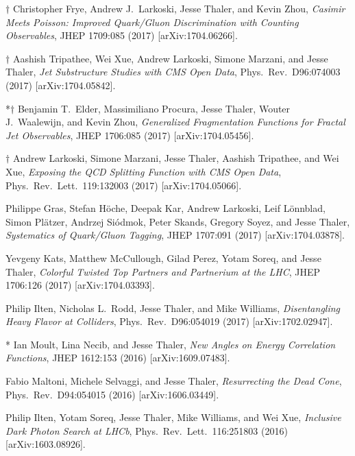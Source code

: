 \begin{list}{[]\addtocounter{jessecount}{-1}}{\leftmargin=3em \itemsep=4pt}
\item
$\dagger$ Christopher Frye, Andrew J.\ Larkoski, Jesse Thaler, and Kevin Zhou,
\emph{Casimir Meets Poisson: Improved Quark/Gluon Discrimination with Counting Observables},
JHEP 1709:085 (2017)
[arXiv:1704.06266].

\item
$\dagger$ Aashish Tripathee, Wei Xue, Andrew Larkoski, Simone Marzani, and Jesse Thaler,
\emph{Jet Substructure Studies with CMS Open Data},
Phys.\ Rev.\ D96:074003 (2017)
[arXiv:1704.05842].

\item
*$\dagger$ Benjamin T.\ Elder, Massimiliano Procura, Jesse Thaler, Wouter J.\ Waalewijn, and Kevin Zhou,
\emph{Generalized Fragmentation Functions for Fractal Jet Observables},
JHEP 1706:085 (2017)
[arXiv:1704.05456].

\item
$\dagger$ Andrew Larkoski, Simone Marzani, Jesse Thaler, Aashish Tripathee, and Wei Xue,
\emph{Exposing the QCD Splitting Function with CMS Open Data},
Phys.\ Rev.\ Lett.\ 119:132003 (2017)
[arXiv:1704.05066].

\item
 Philippe Gras, Stefan Höche, Deepak Kar, Andrew Larkoski, Leif Lönnblad, Simon Plätzer, Andrzej Siódmok, Peter Skands, Gregory Soyez, and Jesse Thaler,
\emph{Systematics of Quark/Gluon Tagging},
JHEP 1707:091 (2017)
[arXiv:1704.03878].

\item
 Yevgeny Kats, Matthew McCullough, Gilad Perez, Yotam Soreq, and Jesse Thaler,
\emph{Colorful Twisted Top Partners and Partnerium at the LHC},
JHEP 1706:126 (2017)
[arXiv:1704.03393].

\item
 Philip Ilten, Nicholas L.\ Rodd, Jesse Thaler, and Mike Williams,
\emph{Disentangling Heavy Flavor at Colliders},
Phys.\ Rev.\ D96:054019 (2017)
[arXiv:1702.02947].

\item
* Ian Moult, Lina Necib, and Jesse Thaler,
\emph{New Angles on Energy Correlation Functions},
JHEP 1612:153 (2016)
[arXiv:1609.07483].

\item
 Fabio Maltoni, Michele Selvaggi, and Jesse Thaler,
\emph{Resurrecting the Dead Cone},
Phys.\ Rev.\ D94:054015 (2016)
[arXiv:1606.03449].

\item
 Philip Ilten, Yotam Soreq, Jesse Thaler, Mike Williams, and Wei Xue,
\emph{Inclusive Dark Photon Search at LHCb},
Phys.\ Rev.\ Lett.\ 116:251803 (2016)
[arXiv:1603.08926].


\end{list}
